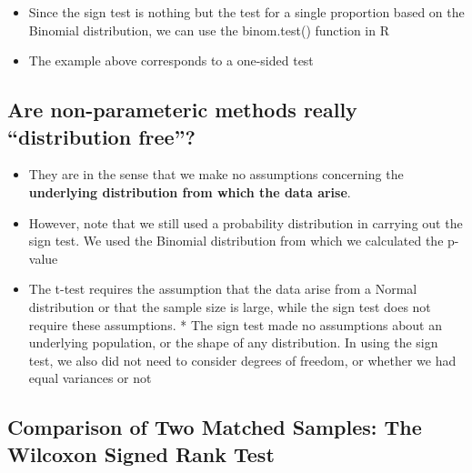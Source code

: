 \documentclass[
]{book}
\providecommand{\tightlist}{%
  \setlength{\itemsep}{0pt}\setlength{\parskip}{0pt}}
\begin{document}
\begin{itemize}
\tightlist
\item
  Since the sign test is nothing but the test for a single proportion based on the Binomial distribution, we can use the binom.test() function in R
\item
  The example above corresponds to a one-sided test
\end{itemize}

\hypertarget{are-non-parameteric-methods-really-distribution-free}{%
\subsection{Are non-parameteric methods really ``distribution free''?}\label{are-non-parameteric-methods-really-distribution-free}}

\begin{itemize}
\tightlist
\item
  They are in the sense that we make no assumptions concerning the \textbf{underlying distribution from which the data arise}.
\item
  However, note that we still used a probability distribution in carrying out the sign test. We used the Binomial distribution from which we calculated the p-value
\item
  The t-test requires the assumption that the data arise from a Normal distribution or that the sample size is large, while the sign test does not require these assumptions. * The sign test made no assumptions about an underlying population, or the shape of any distribution. In using the sign test, we also did not need to consider degrees of freedom, or whether we had equal variances or not
\end{itemize}

\hypertarget{comparison-of-two-matched-samples-the-wilcoxon-signed-rank-test}{%
\subsection{Comparison of Two Matched Samples: The Wilcoxon Signed Rank Test}\label{comparison-of-two-matched-samples-the-wilcoxon-signed-rank-test}}
\end{document}
